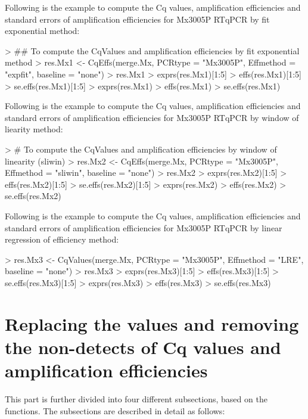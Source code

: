 \documentclass[11pt]{article}
\begin{document}
Following is the example to compute the Cq values, amplification efficiencies and standard errors of amplification efficiencies for Mx3005P RTqPCR by fit exponential method:

\begin{Schunk}
\begin{Sinput}
> ## To compute the CqValues and amplification efficiencies by fit exponential method
> res.Mx1 <- CqEffs(merge.Mx, PCRtype = "Mx3005P", Effmethod = "expfit", baseline = "none")
> res.Mx1 
> exprs(res.Mx1)[1:5] 
> effs(res.Mx1)[1:5] 
> se.effs(res.Mx1)[1:5] 
> exprs(res.Mx1) 
> effs(res.Mx1)
> se.effs(res.Mx1)
\end{Sinput}
\end{Schunk}

Following is the example to compute the Cq values, amplification efficiencies and standard errors of amplification efficiencies for Mx3005P RTqPCR by window of liearity method:

\begin{Schunk}
\begin{Sinput}
> # To compute the CqValues and amplification efficiencies by window of linearity (sliwin)
> res.Mx2 <- CqEffs(merge.Mx, PCRtype = "Mx3005P", Effmethod = "sliwin", baseline = "none")
> res.Mx2 
> exprs(res.Mx2)[1:5] 
> effs(res.Mx2)[1:5] 
> se.effs(res.Mx2)[1:5] 
> exprs(res.Mx2) 
> effs(res.Mx2)
> se.effs(res.Mx2)
\end{Sinput}
\end{Schunk}

Following is the example to compute the Cq values, amplification efficiencies and standard errors of amplification efficiencies for Mx3005P RTqPCR by linear regression of efficiency method:
 
\begin{Schunk}
\begin{Sinput}
> res.Mx3 <- CqValues(merge.Mx, PCRtype = "Mx3005P", Effmethod = "LRE", baseline = "none")
> res.Mx3 
> exprs(res.Mx3)[1:5] 
> effs(res.Mx3)[1:5] 
> se.effs(res.Mx3)[1:5] 
> exprs(res.Mx3) 
> effs(res.Mx3)
> se.effs(res.Mx3)
\end{Sinput}
\end{Schunk}

\section{Replacing the values and removing the non-detects of Cq values and amplification efficiencies} 
This part is further divided into four different subsections, based on the functions. The subsections are described in detail as follows:
\end{document}
